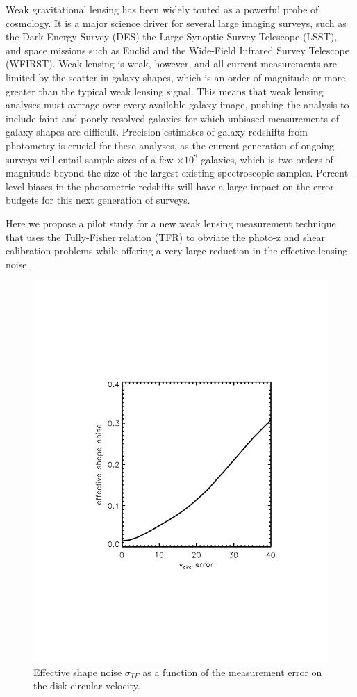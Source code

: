 \documentclass[11pt,preprint]{aastex}
\begin{document}
Weak gravitational lensing has been widely touted as a powerful probe of cosmology. It is a major science driver for several large imaging surveys, such as the Dark Energy Survey (DES) the Large Synoptic Survey Telescope (LSST), and space missions such as Euclid and the Wide-Field Infrared Survey Telescope (WFIRST). Weak lensing is weak, however, and all current measurements are limited by the scatter in galaxy shapes, which is an order of magnitude or more greater than the typical weak lensing signal. This means that weak lensing analyses must average over every available galaxy image, pushing the analysis to include faint and poorly-resolved galaxies for which unbiased measurements of galaxy shapes are difficult. Precision estimates of galaxy redshifts from photometry is crucial for these analyses, as the current generation of ongoing surveys will entail sample sizes of a few $\times10^8$ galaxies, which is two orders of magnitude beyond the size of the largest existing spectroscopic samples. Percent-level biases in the photometric redshifts will have a large impact on the error budgets for this next generation of surveys.

Here we propose a pilot study for a new weak lensing measurement technique that uses the Tully-Fisher relation (TFR) to obviate the photo-z and shear calibration problems while offering a very large reduction in the effective lensing noise.

\begin{figure}[t]
\includegraphics[width=\linewidth, bb= 150 150 550 650,clip]{Plots/vcirc_error.pdf}
\caption{Effective shape noise $\sigma_{TF}$ as a  function of the
  measurement error on the disk circular velocity.}
\label{fig:shapeNoise}
\end{figure}
\end{document}
